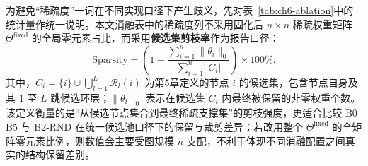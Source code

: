 为避免“稀疏度”一词在不同实现口径下产生歧义，先对表~\ref{tab:ch6-ablation}中的统计量作统一说明。本文消融表中的稀疏度列不采用固化后 $n\times n$ 稀疏权重矩阵 $\Theta^{\mathrm{fixed}}$ 的全局零元素占比，而采用\textbf{候选集剪枝率}作为报告口径：
\begin{equation}
  \mathrm{Sparsity}
  =
  \left(
  1-\frac{\sum_{i=1}^{n}\|\theta_i\|_0}{\sum_{i=1}^{n}|C_i|}
  \right)\times 100\%.
  \label{eq:ch6-ablation-sparsity}
\end{equation}
其中，$C_i=\{i\}\cup\bigcup_{l=1}^{L}\mathcal{R}_l(i)$ 为第5章定义的节点 $i$ 的候选集，包含节点自身及其 $1$ 至 $L$ 跳候选环层；$\|\theta_i\|_0$ 表示在候选集 $C_i$ 内最终被保留的非零权重个数。该定义衡量的是“从候选节点集合到最终稀疏支撑集”的剪枝强度，更适合比较 B0--B5 与 B2-RND 在统一候选池口径下的保留与裁剪差异；若改用整个 $\Theta^{\mathrm{fixed}}$ 的全矩阵零元素比例，则数值会主要受图规模 $n$ 支配，不利于体现不同消融配置之间真实的结构保留差别。

